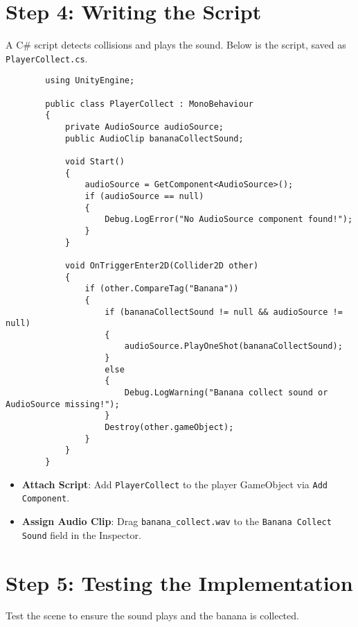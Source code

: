 \documentclass[a4paper,12pt]{article}
\begin{document}
	\section{Step 4: Writing the Script}
	A C\# script detects collisions and plays the sound. Below is the script, saved as \texttt{PlayerCollect.cs}.
	
	\begin{lstlisting}
		using UnityEngine;
		
		public class PlayerCollect : MonoBehaviour
		{
			private AudioSource audioSource;
			public AudioClip bananaCollectSound;
			
			void Start()
			{
				audioSource = GetComponent<AudioSource>();
				if (audioSource == null)
				{
					Debug.LogError("No AudioSource component found!");
				}
			}
			
			void OnTriggerEnter2D(Collider2D other)
			{
				if (other.CompareTag("Banana"))
				{
					if (bananaCollectSound != null && audioSource != null)
					{
						audioSource.PlayOneShot(bananaCollectSound);
					}
					else
					{
						Debug.LogWarning("Banana collect sound or AudioSource missing!");
					}
					Destroy(other.gameObject);
				}
			}
		}
	\end{lstlisting}
	
	\begin{itemize}
		\item \textbf{Attach Script}: Add \texttt{PlayerCollect} to the player GameObject via \texttt{Add Component}.
		\item \textbf{Assign Audio Clip}: Drag \texttt{banana\_collect.wav} to the \texttt{Banana Collect Sound} field in the Inspector.
	\end{itemize}
	
	\section{Step 5: Testing the Implementation}
	Test the scene to ensure the sound plays and the banana is collected.
	
\end{document}

